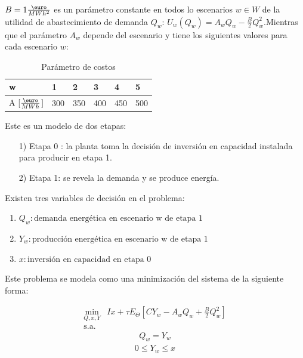 $B = 1\frac{\textup{\euro}}{MWh^2}$ es un parámetro constante en todos lo escenarios $w \in W$ de la utilidad de abastecimiento de demanda $Q_w$: $U_w(Q_w) = A_wQ_w-\frac{B}{2}Q_w^2$.Mientras que el parámetro $A_w$ depende del escenario y tiene los siguientes valores para cada escenario $w$:

\begin{table}[H]
\centering
\begin{tabular}{|l|l|l|l|l|l|}
\hline
\textbf{w} & \textbf{1} & \textbf{2} & 3 & 4 & 5 \\ \hline
A {[$\frac{\textup{\euro}}{MWh}$]} & 300 & 350 & 400 & 450 & 500 \\ \hline
\end{tabular}
\caption{Parámetro de costos}
\end{table}

\vspace{2.5mm}

Este es un modelo de dos etapas:
\begin{enumerate}
    \item[1)] Etapa 0 : la planta toma la decisión de inversión en capacidad instalada para producir en etapa 1.
    \item[2)] Etapa 1: se revela la demanda y se produce energía.
\end{enumerate}

Existen tres variables de decisión en el problema:
\vspace{2.5mm}
\begin{enumerate}
    \item $Q_w: \text{demanda energética en escenario w de etapa 1}$
    \item $Y_w: \text{producción energética en escenario w de etapa 1}$
    \item $x: \text{inversión en capacidad en etapa 0}$
\end{enumerate}

Este problema se modela como una minimización del sistema de la siguiente forma:

\begin{equation}
\begin{array}{rrclcl}
    \displaystyle \min_{Q,x,Y} & Ix+\tau E_{\Theta}[CY_w-A_wQ_w+\frac{B}{2}Q_w^2]  \\\textrm{s.a.} \label{eq:331}
\end{array}
\end{equation}
\begin{equation}
\begin{array}{cl}
    Q_w=Y_w \label{res1:331}
\end{array}
\end{equation}
\begin{equation}
\begin{array}{cl}
   0\leq Y_w \leq x\label{res2:331}
\end{array}
\end{equation}

